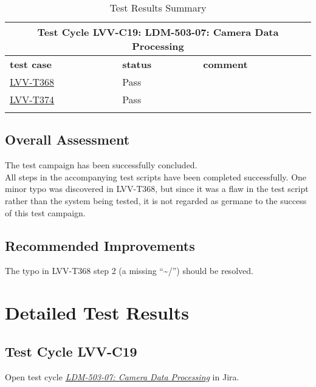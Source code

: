 \documentclass[DM,STR,toc]{lsstdoc}
\begin{document}
\begin{longtable} {p{}p{}p{}}
\toprule
  \multicolumn{3}{c}{ Test Cycle {\bf LVV-C19: LDM-503-07: Camera Data Processing }} \\\hline
  {\bf \footnotesize test case} & {\bf \footnotesize status} & {\bf \footnotesize comment} \\\toprule
    \href{https://jira.lsstcorp.org/secure/Tests.jspa#/testCase/LVV-T368}{LVV-T368} 
    & Pass & 
    \\\hline
    \href{https://jira.lsstcorp.org/secure/Tests.jspa#/testCase/LVV-T374}{LVV-T374} 
    & Pass & 
    \\\hline

\caption{Test Results Summary}
\label{table:summary}
\end{longtable}

\subsection{Overall Assessment}
\label{sect:overallassessment}

The test campaign has been successfully concluded.\\[2\baselineskip]All
steps in the accompanying test scripts have been completed successfully.
One minor typo was discovered in LVV-T368, but since it was a flaw in
the test script rather than the system being tested, it is not regarded
as germane to the success of this test campaign.


\subsection{Recommended Improvements}
\label{sect:recommendations}

The typo in LVV-T368 step 2 (a missing ``\textasciitilde{}/'') should be
resolved.


\newpage
\section{Detailed Test Results}
\label{sect:detailedtestresults}


  \subsection{Test Cycle LVV-C19 }

Open test cycle {\it \href{https://jira.lsstcorp.org/secure/Tests.jspa#/testrun/LVV-C19}{LDM-503-07: Camera Data Processing}} in Jira.
\end{document}

